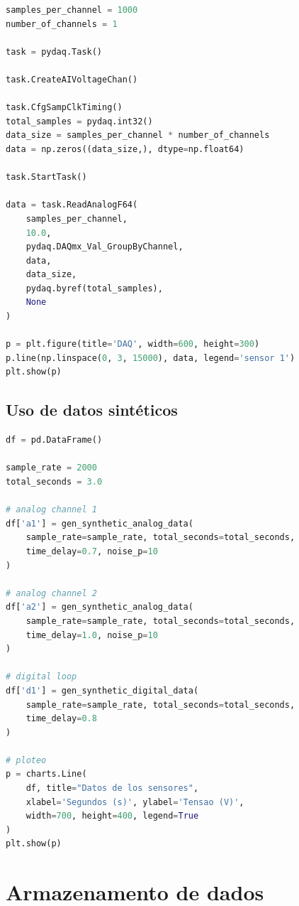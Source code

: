 \documentclass{ufscThesis}
\begin{document}
\begin{lstlisting}[language=Python, caption=Aquisição de dados com PyDAQmx, label={lst:pydaqmx}]
samples_per_channel = 1000
number_of_channels = 1

task = pydaq.Task()

task.CreateAIVoltageChan()

task.CfgSampClkTiming()
total_samples = pydaq.int32()
data_size = samples_per_channel * number_of_channels
data = np.zeros((data_size,), dtype=np.float64)

task.StartTask()

data = task.ReadAnalogF64(
    samples_per_channel,
    10.0,
    pydaq.DAQmx_Val_GroupByChannel,
    data,
    data_size,
    pydaq.byref(total_samples),
    None
)

p = plt.figure(title='DAQ', width=600, height=300)
p.line(np.linspace(0, 3, 15000), data, legend='sensor 1')
plt.show(p)
\end{lstlisting}

\subsection{Uso de datos sintéticos}\label{algoritmos-daq-sintetico}

\begin{lstlisting}[language=Python, caption=Geração de dados sintéticos, label={lst:daq-sintetico}]
df = pd.DataFrame()

sample_rate = 2000
total_seconds = 3.0

# analog channel 1
df['a1'] = gen_synthetic_analog_data(
    sample_rate=sample_rate, total_seconds=total_seconds, 
    time_delay=0.7, noise_p=10
)

# analog channel 2
df['a2'] = gen_synthetic_analog_data(
    sample_rate=sample_rate, total_seconds=total_seconds, 
    time_delay=1.0, noise_p=10
)

# digital loop
df['d1'] = gen_synthetic_digital_data(
    sample_rate=sample_rate, total_seconds=total_seconds, 
    time_delay=0.8
)

# ploteo
p = charts.Line(
    df, title="Datos de los sensores", 
    xlabel='Segundos (s)', ylabel='Tensao (V)', 
    width=700, height=400, legend=True
)
plt.show(p)
\end{lstlisting}

\section{Armazenamento de dados}\label{algoritmos-armazenamento}
\end{document}
